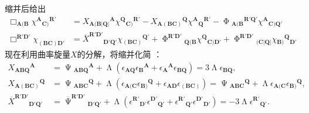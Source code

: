 缩并后给出
\begin{equation*}
	\begin{aligned}
		\Box _{\boldsymbol{A}(\boldsymbol{B}} \chi ^{\boldsymbol{A}}{}{_{\boldsymbol{C})}}^{\boldsymbol{R} '} & =X{_{\boldsymbol{A}(\boldsymbol{B}| \boldsymbol{Q}| }}^{\boldsymbol{A}} \chi ^{\boldsymbol{Q}}{}{_{\boldsymbol{C})}}^{\boldsymbol{R} '} -X{_{\boldsymbol{A}(\boldsymbol{BC})}}^{\boldsymbol{Q}} \chi ^{\boldsymbol{A}}{}{_{\boldsymbol{Q}}}^{\boldsymbol{R} '} -\upPhi {_{\boldsymbol{A}(\boldsymbol{B}}}^{\boldsymbol{R}\mathbf{'}\boldsymbol{Q} '} \chi ^{\boldsymbol{A}}{}_{\boldsymbol{C})\boldsymbol{Q} '}\\
		\Box ^{\boldsymbol{R} '\boldsymbol{D} '} \chi _{(\boldsymbol{BC})\boldsymbol{D} '} & =\overline{X}^{\boldsymbol{R} '\boldsymbol{D} '}{}_{\boldsymbol{D} '\boldsymbol{Q} '} \chi {_{(\boldsymbol{BC})}}^{\boldsymbol{Q} '} +\upPhi ^{\boldsymbol{R} '\boldsymbol{D} '}{}_{\boldsymbol{Q}(\boldsymbol{B}} \chi ^{\boldsymbol{Q}}{}_{\boldsymbol{C})\boldsymbol{D} '} +\upPhi ^{\boldsymbol{R} '\boldsymbol{D} '}{}_{(\boldsymbol{C}| \boldsymbol{Q}| } \chi {_{\boldsymbol{B})}}^{\boldsymbol{Q}}{}_{\boldsymbol{D} '}
	\end{aligned}
\end{equation*}
现在利用曲率旋量$X$的分解，将缩并化简 ：
\begin{equation*}
	\begin{aligned}
		X{_{\boldsymbol{ABQ}}}^{\boldsymbol{A}} & =\upPsi {_{\boldsymbol{ABQ}}}^{\boldsymbol{A}} +\upLambda (\epsilon _{\boldsymbol{AQ}} \epsilon {_{\boldsymbol{B}}}^{\boldsymbol{A}} +\epsilon {_{\boldsymbol{A}}}^{\boldsymbol{A}} \epsilon _{\boldsymbol{BQ}} )=3\upLambda \epsilon _{\boldsymbol{BQ}} ,\\
		X{_{\boldsymbol{A}(\boldsymbol{BC})}}^{\boldsymbol{Q}} & =\upPsi {_{\boldsymbol{ABC}}}^{\boldsymbol{Q}} +\upLambda (\epsilon _{\boldsymbol{A}(\boldsymbol{C}} \epsilon {_{\boldsymbol{B})}}^{\boldsymbol{Q}} +\epsilon _{\boldsymbol{AD}} \epsilon _{(\boldsymbol{BC})}) =\upPsi {_{\boldsymbol{ABC}}}^{\boldsymbol{Q}} +\upLambda \epsilon _{\boldsymbol{A}(\boldsymbol{C}} \epsilon {_{\boldsymbol{B})}}^{\boldsymbol{Q}} ,\\
		\overline{X}^{\boldsymbol{R} '\boldsymbol{D} '}{}_{\boldsymbol{D} '\boldsymbol{Q} '} & =\overline{\upPsi }^{\boldsymbol{R} '\boldsymbol{D} '}{}_{\boldsymbol{D} '\boldsymbol{Q} '} +\upLambda (\epsilon ^{\boldsymbol{R} '}{}_{\boldsymbol{D} '} \epsilon ^{\boldsymbol{D} '}{}_{\boldsymbol{Q} '} +\epsilon ^{\boldsymbol{R} '}{}_{\boldsymbol{Q} '} \epsilon ^{\boldsymbol{D} '}{}_{\boldsymbol{D} '} )=-3\upLambda \epsilon ^{\boldsymbol{R} '}{}_{\boldsymbol{Q} '} .
	\end{aligned}
\end{equation*}
